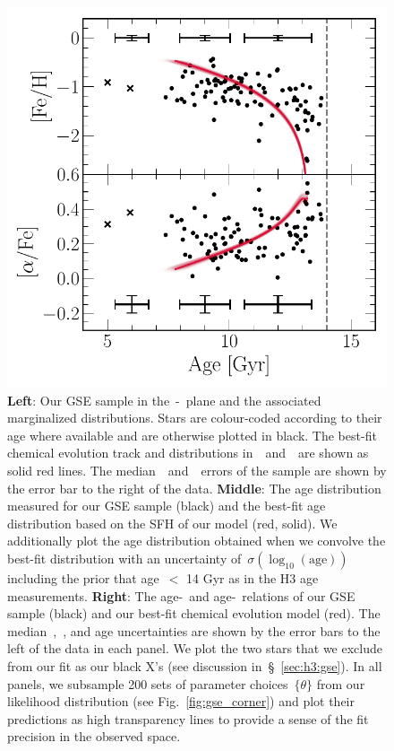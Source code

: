 \documentclass[ms.tex]{subfiles}
\begin{document}
\begin{figure}
\includegraphics[scale = 0.42]{gsefit_amr.pdf}
\caption{
\textbf{Left}: Our GSE sample in the~\afe-\feh~plane and the associated
marginalized distributions.
Stars are colour-coded according to their age where available and are otherwise
plotted in black.
The best-fit chemical evolution track and distributions in~\afe~and~\feh~are
shown as solid red lines.
The median~\feh~and~\afe~errors of the sample are shown by the error bar to the
right of the data. 
\textbf{Middle}: The age distribution measured for our GSE sample (black) and
the best-fit age distribution based on the SFH of our model (red, solid).
We additionally plot the age distribution obtained when we convolve the best-fit
distribution with an uncertainty of~$\sigma(\log_{10}(\text{age}))$ including
the prior that age~$<$ 14 Gyr as in the H3 age measurements.
\textbf{Right}: The age-\feh~and age-\afe~relations of our GSE sample (black)
and our best-fit chemical evolution model (red).
The median~\feh,~\afe, and age uncertainties are shown by the error bars to the
left of the data in each panel.
We plot the two stars that we exclude from our fit as our black X's (see
discussion in~\S~\ref{sec:h3:gse}).
In all panels, we subsample 200 sets of parameter choices~$\{\theta\}$ from our
likelihood distribution (see Fig.~\ref{fig:gse_corner}) and plot their
predictions as high transparency lines to provide a sense of the fit precision
in the observed space.
}
\label{fig:gse_bestfit}
\end{figure}
\end{document}
